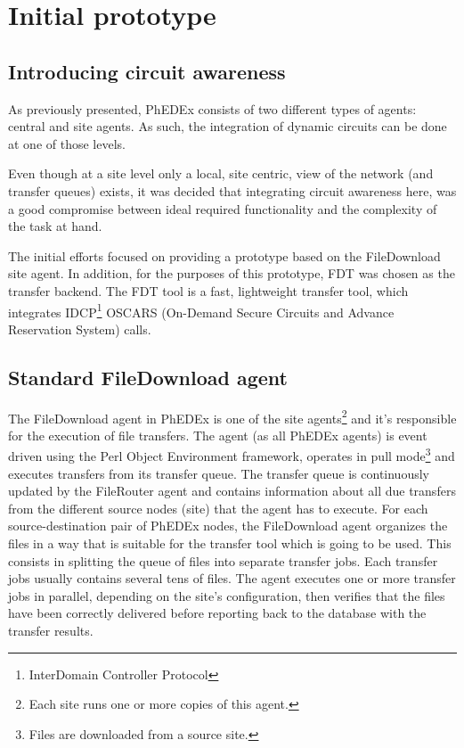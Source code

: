 \section{Initial prototype}

\subsection{Introducing circuit awareness}

As previously presented, PhEDEx consists of two different types of agents: 
central and site agents. As such, the integration of dynamic circuits can 
be done at one of those levels.

Even though at a site level only a local, site centric, view of
the network (and transfer queues) exists, it was decided that integrating 
circuit awareness here, was a good compromise between ideal required 
functionality and the complexity of the task at hand.

The initial efforts\cite{ANSE-ISGC} focused on providing a prototype based on the FileDownload
site agent. In addition, for the purposes of this prototype, FDT\cite{FDT} was chosen
as the transfer backend. The FDT tool is a fast, lightweight transfer tool,
which integrates IDCP\footnote{InterDomain Controller Protocol} 
OSCARS\cite{OSCARS} (On-Demand Secure Circuits and Advance Reservation System) calls.

\subsection{Standard FileDownload agent}

The FileDownload agent in PhEDEx is one of the site agents\footnote{
Each site runs one or more copies of this agent.} and it's responsible for the
execution of file transfers. The agent (as all PhEDEx agents) is event driven 
using the Perl Object Environment framework, operates in pull mode\footnote{Files are
downloaded from a source site.} and executes transfers from its transfer queue.
The transfer queue is continuously updated by the FileRouter agent and contains 
information about all due transfers from the different source nodes (site) that the agent 
has to execute. For each source-destination pair of PhEDEx nodes, the FileDownload 
agent organizes the files in a way that is suitable for the transfer tool which is 
going to be used. This consists in splitting the queue of files into separate 
transfer jobs. Each transfer jobs usually contains several tens of files.
The agent executes one or more transfer jobs in parallel, depending 
on the site's configuration, then verifies that the files have been correctly 
delivered before reporting back to the database with the transfer results.

